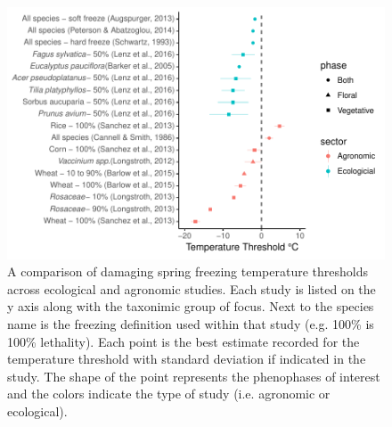 \documentclass{article}\usepackage[]{graphicx}\usepackage[]{color}
\makeatletter
\def\maxwidth{ %
  \ifdim\Gin@nat@width>\linewidth
    \linewidth
  \else
    \Gin@nat@width
  \fi
}
\makeatother
\begin{document}
\begin{figure}[H]

{\centering \includegraphics[width=\maxwidth]{figure/temp-1} 

}

\caption[A comparison of damaging spring freezing temperature thresholds across ecological and agronomic studies]{A comparison of damaging spring freezing temperature thresholds across ecological and agronomic studies. Each study is listed on the y axis along with the taxonimic group of focus. Next to the species name is the freezing definition used within that study (e.g. 100\% is 100\% lethality). Each point is the best estimate recorded for the temperature threshold with standard deviation if indicated in the study. The shape of the point represents the phenophases of interest and the colors indicate the type of study (i.e. agronomic or ecological).}\label{fig:temp}
\end{figure}
\end{document}

